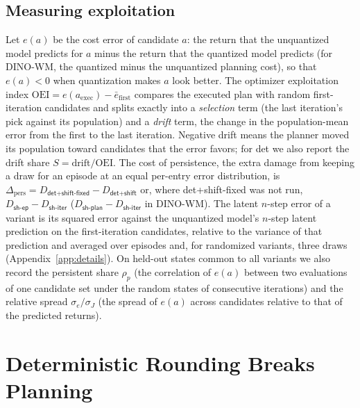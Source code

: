 \documentclass[10pt]{article}
\newcommand{\dtm}{\textsf{det}\xspace}
\newcommand{\shiter}{\textsf{sh-iter}\xspace}
\newcommand{\shep}{\textsf{sh-ep}\xspace}
\newcommand{\shplan}{\textsf{sh-plan}\xspace}
\newcommand{\detshift}{\textsf{det+shift}\xspace}
\newcommand{\detshiftfix}{\textsf{det+shift-fixed}\xspace}
\newcommand{\dpers}{\Delta_{\mathrm{pers}}}
\begin{document}
\subsection{Measuring exploitation}
\label{sec:oei}
Let $e(a)$ be the cost error of candidate $a$: the return that the unquantized model predicts for $a$ minus the return that the quantized model predicts (for DINO-WM, the quantized minus the unquantized planning cost), so that $e(a)<0$ when quantization makes $a$ look better. The optimizer exploitation index $\mathrm{OEI}=e(a_{\mathrm{exec}})-\bar e_{\mathrm{first}}$ compares the executed plan with random first-iteration candidates and splits exactly into a \emph{selection} term (the last iteration's pick against its population) and a \emph{drift} term, the change in the population-mean error from the first to the last iteration. Negative drift means the planner moved its population toward candidates that the error favors; for \dtm we also report the drift share $S=\mathrm{drift}/\mathrm{OEI}$. The cost of persistence, the extra damage from keeping a draw for an episode at an equal per-entry error distribution, is $\dpers=D_{\detshiftfix}-D_{\detshift}$ or, where \detshiftfix was not run, $D_{\shep}-D_{\shiter}$ ($D_{\shplan}-D_{\shiter}$ in DINO-WM). The latent $n$-step error of a variant is its squared error against the unquantized model's $n$-step latent prediction on the first-iteration candidates, relative to the variance of that prediction and averaged over episodes and, for randomized variants, three draws (Appendix~\ref{app:details}). On held-out states common to all variants we also record the persistent share $\rho_p$ (the correlation of $e(a)$ between two evaluations of one candidate set under the random states of consecutive iterations) and the relative spread $\sigma_e/\sigma_J$ (the spread of $e(a)$ across candidates relative to that of the predicted returns).

\section{Deterministic Rounding Breaks Planning}
\label{sec:break}
\end{document}

